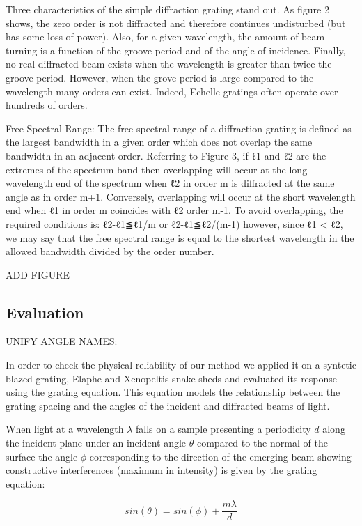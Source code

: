 Three characteristics of the simple diffraction grating stand out. As figure 2 shows, the zero order is not diffracted and therefore continues undisturbed (but has some loss of power). Also, for a given wavelength, the amount of beam turning is a function of the groove period and of the angle of incidence. Finally, no real diffracted beam exists when the wavelength is greater than twice the groove period. However, when the grove period is large compared to the wavelength many orders can exist. Indeed, Echelle gratings often operate over hundreds of orders.

Free Spectral Range:
The free spectral range of a diffraction grating is defined as the largest bandwidth in a given order which does not overlap the same bandwidth in an adjacent order. Referring to Figure 3, if ℓ1 and ℓ2 are the extremes of the spectrum band then overlapping will occur at the long wavelength end of the spectrum when ℓ2 in order m is diffracted at the same angle as in order m+1. Conversely, overlapping will occur at the short wavelength end when ℓ1 in order m coincides with ℓ2 order m-1. To avoid overlapping, the required conditions is:
ℓ2-ℓ1≦ℓ1/m or ℓ2-ℓ1≦ℓ2/(m-1)
however, since ℓ1 < ℓ2, we may say that the free spectral range is equal to the shortest wavelength in the allowed bandwidth divided by the order number.

ADD FIGURE


\subsection{Evaluation}
UNIFY ANGLE NAMES: 

In order to check the physical reliability of our method we applied it on a syntetic blazed grating, Elaphe and Xenopeltis snake sheds and evaluated its response using the grating equation. This equation models the relationship between the grating spacing and the angles of the incident and diffracted beams of light. 

When light at a wavelength $\lambda$ falls on a sample presenting a periodicity $d$ along the incident plane under an incident angle $\theta$ compared to the normal of the surface the angle $\phi$ corresponding to the direction of the emerging beam showing constructive interferences (maximum in intensity) is given by the grating equation:

\begin{equation}
  sin(\theta) = sin(\phi) + \frac{m \lambda}{d}
\end{equation}

